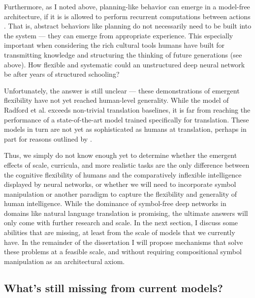 Furthermore, as I noted above, planning-like behavior can emerge in a model-free architecture, if it is is allowed to perform recurrent computations between actions \cite{Guez2019}. That is, abstract behaviors like planning do not necessarily need to be built into the system --- they can emerge from appropriate experience. This especially important when considering the rich cultural tools humans have built for transmitting knowledge and structuring the thinking of future generations (see above). How flexible and systematic could an unstructured deep neural network be after years of structured schooling? \par 
Unfortunately, the answer is still unclear --- these demonstrations of emergent flexibility have not yet reached human-level generality. While the model of Radford et al. exceeds non-trivial translation baselines, it is far from reaching the performance of a state-of-the-art model trained specifically for translation. These models in turn are not yet as sophisticated as humans at translation, perhaps in part for reasons outlined by \citet{McClelland2019}. \par
Thus, we simply do not know enough yet to determine whether the emergent effects of scale, curricula, and more realistic tasks are the only difference between the cognitive flexibility of humans and the comparatively inflexible intelligence displayed by neural networks, or whether we will need to incorporate symbol manipulation or another paradigm to capture the flexibility and generality of human intelligence. While the dominance of symbol-free deep networks in domains like natural language translation is promising, the ultimate answers will only come with further research and scale. In the next section, I discuss some abilities that are missing, at least from the scale of models that we currently have. In the remainder of the dissertation I will propose mechanisms that solve these problems at a feasible scale, and without requiring compositional symbol manipulation as an architectural axiom. \par 

\subsection{What's still missing from current models?}

